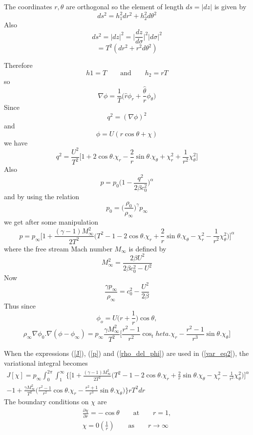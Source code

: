 \documentclass[a4paper]{article}
\begin{document}
	The coordinates $r, \theta$ are orthogonal so the element of length $ds = |dz|$ is given by
	$$
	ds^2 = h_1^2dr^2 + h_2^2d\theta^2
	$$
	Also
	$$
	ds^2 = |dz|^2 = \Biggl|\frac{dz}{d\sigma}\Biggr|^2|d\sigma|^2
	$$
	$$=T^2(dr^2+r^2d\theta^2)$$
	
	Therefore
	$$h1=T \qquad \text{and} \qquad h_2=rT$$	
	so
	$$ \nabla \phi = \frac{1}{T} 
	\Biggl(
		\hat{r}\phi_r + \frac{\hat{\theta}}{r}\phi_\theta
	\Biggr)
	$$
	Since
	$$q^2=(\nabla \phi)^2$$
	and
	$$\phi = U(r\cos \theta+\chi)$$
	we have
	\begin{equation}\label{q2}
		q^2 = 
		\frac{U^2}{T^2}
		\Biggl[
			1 + 2\cos\theta. \chi_r - \frac{2}{r} \sin\theta. \chi_\theta +
			\chi_r^2 + \frac{1}{r^2}\chi_\theta^2
		\Biggr]
	\end{equation}
	Also
	$$
	p = p_0\Biggl(
		1 - \frac{q^2}{2\beta c_0^2}
	\Biggr)^\alpha
	$$
	and by using the relation
	$$
	p_0 = \Biggl(\frac{\rho_0}{\rho_\infty}\Biggr)^\gamma p_\infty
	$$
	we get after some manipulation
	\begin{equation} \label{p}
	p = p_\infty \Biggl[
		1+\frac{(\gamma-1)M_\infty^2}{2T^2}
		\Biggl(
			T^2-1-2\cos\theta.\chi_r +
			\frac{2}{r}\sin\theta.\chi_\theta
			-\chi_r^2-\frac{1}{r^2}\chi_\theta^2
		\Biggr)
	\Biggr]^\alpha
	\end{equation}
	where the free stream Mach number $M_\infty$ is defined by
	$$
	M^2_\infty = \frac{2\beta U^2}{2\beta c_0^2-U^2}
	$$
	Now
	$$
	\frac{\gamma p_\infty}{\rho_\infty} = c_0^2 - \frac{U^2}{2\beta}
	$$
	Thus since
	$$\phi_o = U\Biggl(r+\frac{1}{r}\Biggr)\cos\theta ,$$
	\begin{equation}	\label{rho_del_phi}
		\rho_\infty \nabla\phi_0 . \nabla(\phi-\phi_\infty) = 
		p_\infty \frac{\gamma M^2_\infty}{T^2}
		\Biggl[
			\frac{r^2-1}{r^2}\cos_theta.\chi_r
			-\frac{r^2-1}{r^3}\sin \theta.\chi_\theta
		\Biggr]
	\end{equation}		
	
	When the expressions (\ref{J}), (\ref{p}) and (\ref{rho_del_phi}) are used in (\ref{var_eq2}), the variational integral becomes
	\begin{equation} \label{var_int}
	\begin{split}		
		J[\chi] = p_\infty \int_0^{2\pi} \int_1^\infty
		\Biggl\{
			\Biggl[
				1 + \frac{(\gamma-1)M_\infty^2}{2T^2}
				\Biggl(
					T^2-1-2\cos\theta.\chi_r+\frac{2}{r}\sin\theta.\chi_\theta - \chi_r^2-\frac{1}{r^2}\chi_\theta^2
				\Biggr)
			\Biggr]^\alpha \\
			-1+\frac{\gamma M_\infty^2}{T^2}
			\Biggl(
				\frac{r^2-1}{r^2}\cos\theta.\chi_r
				- \frac{r^2+1}{r^3}\sin\theta.\chi_\theta
			\Biggr)
		\Biggr\}rT^2dr
	\end{split}
	\end{equation}
	The boundary conditions on $\chi$ are
	\begin{equation}\label{bc}
	\begin{split}
		\frac{\partial\chi}{\partial r} = -\cos\theta \qquad \text{at} \qquad r=1, \\
		\chi = 0 \left(\frac{1}{r}\right) \qquad \text{as} \qquad r \rightarrow \infty
	\end{split}
	\end{equation}
	
\end{document}
